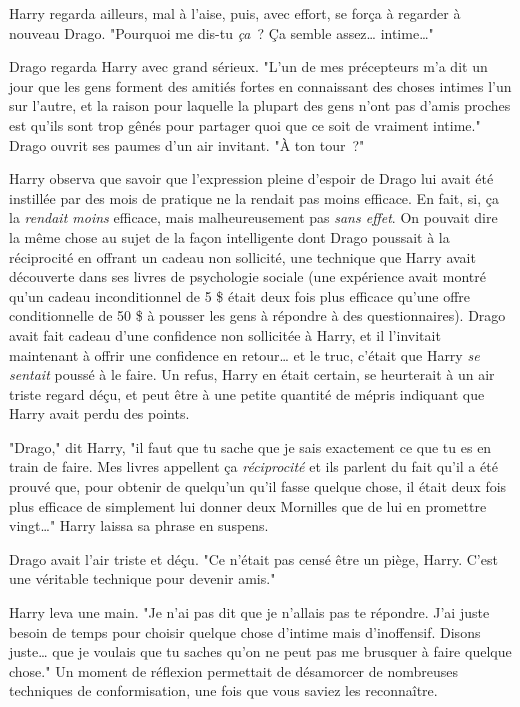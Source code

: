 Harry regarda ailleurs, mal à l'aise, puis, avec effort, se força à regarder à nouveau Drago. "Pourquoi me dis-tu \emph{ça}~? Ça semble assez… intime…"

Drago regarda Harry avec grand sérieux. "L'un de mes précepteurs m'a dit un jour que les gens forment des amitiés fortes en connaissant des choses intimes l'un sur l'autre, et la raison pour laquelle la plupart des gens n'ont pas d'amis proches est qu'ils sont trop gênés pour partager quoi que ce soit de vraiment intime." Drago ouvrit ses paumes d'un air invitant. "À ton tour~?"

Harry observa que savoir que l'expression pleine d'espoir de Drago lui avait été instillée par des mois de pratique ne la rendait pas moins efficace. En fait, si, ça la \emph{rendait moins} efficace, mais malheureusement pas \emph{sans effet}. On pouvait dire la même chose au sujet de la façon intelligente dont Drago poussait à la réciprocité en offrant un cadeau non sollicité, une technique que Harry avait découverte dans ses livres de psychologie sociale (une expérience avait montré qu'un cadeau inconditionnel de 5 \$ était deux fois plus efficace qu'une offre conditionnelle de 50 \$ à pousser les gens à répondre à des questionnaires). Drago avait fait cadeau d'une confidence non sollicitée à Harry, et il l'invitait maintenant à offrir une confidence en retour… et le truc, c'était que Harry \emph{se sentait} poussé à le faire. Un refus, Harry en était certain, se heurterait à un air triste regard déçu, et peut être à une petite quantité de mépris indiquant que Harry avait perdu des points.

"Drago," dit Harry, "il faut que tu sache que je sais exactement ce que tu es en train de faire. Mes livres appellent ça \emph{réciprocité} et ils parlent du fait qu'il a été prouvé que, pour obtenir de quelqu'un qu'il fasse quelque chose, il était deux fois plus efficace de simplement lui donner deux Mornilles que de lui en promettre vingt…" Harry laissa sa phrase en suspens.

Drago avait l'air triste et déçu. "Ce n'était pas censé être un piège, Harry. C'est une véritable technique pour devenir amis."

Harry leva une main. "Je n'ai pas dit que je n'allais pas te répondre. J'ai juste besoin de temps pour choisir quelque chose d'intime mais d'inoffensif. Disons juste… que je voulais que tu saches qu'on ne peut pas me brusquer à faire quelque chose." Un moment de réflexion permettait de désamorcer de nombreuses techniques de conformisation, une fois que vous saviez les reconnaître.

